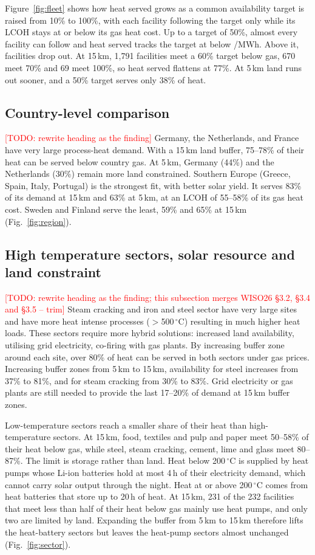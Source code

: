\documentclass[11pt]{article}
\newcommand{\todo}[1]{\textcolor{red}{[TODO: #1]}}
\begin{document}
Figure~\ref{fig:fleet} shows how heat served grows as a common availability target is raised from 10\% to 100\%, with each facility following the target only while its LCOH stays at or below its gas heat cost. Up to a target of 50\%, almost every facility can follow and heat served tracks the target at below /MWh. Above it, facilities drop out. At 15\,km, 1,791 facilities meet a 60\% target below gas, 670 meet 70\% and 69 meet 100\%, so heat served flattens at 77\%. At 5\,km land runs out sooner, and a 50\% target serves only 38\% of heat.

\subsection*{Country-level comparison}
\todo{rewrite heading as the finding}
Germany, the Netherlands, and France have very large process-heat demand. With a 15\,km land buffer, 75--78\% of their heat can be served below country gas. At 5\,km, Germany (44\%) and the Netherlands (30\%) remain more land constrained. Southern Europe (Greece, Spain, Italy, Portugal) is the strongest fit, with better solar yield. It serves 83\% of its demand at 15\,km and 63\% at 5\,km, at an LCOH of 55--58\% of its gas heat cost. Sweden and Finland serve the least, 59\% and 65\% at 15\,km (Fig.~\ref{fig:region}).

\subsection*{High temperature sectors, solar resource and land constraint}
\todo{rewrite heading as the finding; this subsection merges WISO26 \S3.2, \S3.4 and \S3.5 -- trim}
Steam cracking and iron and steel sector have very large sites and have more heat intense processes ($>$500\,$^\circ$C) resulting in much higher heat loads. These sectors require more hybrid solutions: increased land availability, utilising grid electricity, co-firing with gas plants. By increasing buffer zone around each site, over 80\% of heat can be served in both sectors under gas prices. Increasing buffer zones from 5\,km to 15\,km, availability for steel increases from 37\% to 81\%, and for steam cracking from 30\% to 83\%. Grid electricity or gas plants are still needed to provide the last 17--20\% of demand at 15\,km buffer zones.

Low-temperature sectors reach a smaller share of their heat than high-temperature sectors. At 15\,km, food, textiles and pulp and paper meet 50--58\% of their heat below gas, while steel, steam cracking, cement, lime and glass meet 80--87\%. The limit is storage rather than land. Heat below 200\,$^\circ$C is supplied by heat pumps whose Li-ion batteries hold at most 4\,h of their electricity demand, which cannot carry solar output through the night. Heat at or above 200\,$^\circ$C comes from heat batteries that store up to 20\,h of heat. At 15\,km, 231 of the 232 facilities that meet less than half of their heat below gas mainly use heat pumps, and only two are limited by land. Expanding the buffer from 5\,km to 15\,km therefore lifts the heat-battery sectors but leaves the heat-pump sectors almost unchanged (Fig.~\ref{fig:sector}).
\end{document}
